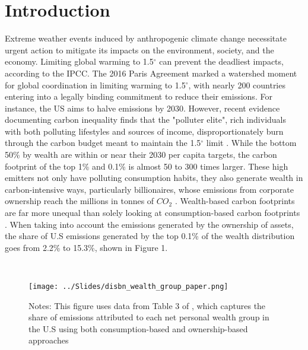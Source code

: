 \documentclass[12pt,a4paper]{article}
\begin{document}
\section{Introduction} 
\hspace*{6mm} Extreme weather events induced by anthropogenic climate change necessitate urgent action to mitigate its impacts on the environment, society, and the economy. Limiting global warming to 1.5$^{\circ}$ can prevent the deadliest impacts, according to the IPCC. The 2016 Paris Agreement marked a watershed moment for global coordination in limiting warming to 1.5$^{\circ}$, with nearly 200 countries entering into a legally binding commitment to reduce their emissions. For instance, the US aims to halve emissions by 2030. However, recent evidence documenting carbon inequality finds that the "polluter elite", rich individuals with both polluting lifestyles and sources of income, disproportionately burn through the carbon budget meant to maintain the 1.5$^{\circ}$ limit \citep{chancel2022global, starr2023income, starr2023assessing}. While the bottom 50\% by wealth are within or near their 2030 per capita targets, the carbon footprint of the top 1\% and 0.1\% is almost 50 to 300 times larger. These high emitters not only have polluting consumption habits, they also generate wealth in carbon-intensive ways, particularly billionaires, whose emissions from corporate ownership reach the millions in tonnes of $CO_2$ \citep{maitland2022carbon}. Wealth-based carbon footprints are far more unequal than solely looking at consumption-based carbon footprints \citep{chancelandrehm}. When taking into account the emissions generated by the ownership of assets, the share of U.S emissions generated by the top 0.1\% of the wealth distribution goes from 2.2\% to 15.3\%, shown in Figure 1.

\begin{figure}[h]
\centering
{}\\  %
\vspace{0.5em}

\texttt{[image: ../Slides/disbn\_wealth\_group\_paper.png]} 
\captionsetup{font=footnotesize}  %
\caption*{Notes: This figure uses data from Table 3 of \cite{chancelandrehm}, which captures the share of emissions attributed to each net personal wealth group in the U.S using both consumption-based and ownership-based approaches}  %
\end{figure}
\end{document}
